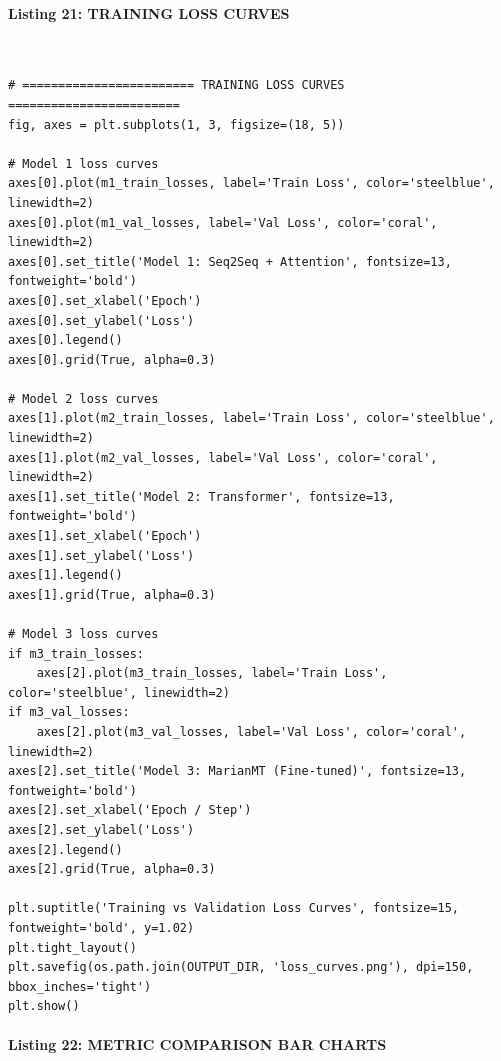 \documentclass[12pt,a4paper,oneside]{report}
\begin{document}
\paragraph{Listing 21: TRAINING LOSS CURVES}\mbox{}\\[-1ex]
\begin{Verbatim}[commandchars=\\\{\},breaklines=true,breakanywhere=true,fontsize=\scriptsize,frame=leftline,framesep=2mm,rulecolor=\color{gray}]
# ======================== TRAINING LOSS CURVES ========================
fig, axes = plt.subplots(1, 3, figsize=(18, 5))

# Model 1 loss curves
axes[0].plot(m1_train_losses, label='Train Loss', color='steelblue', linewidth=2)
axes[0].plot(m1_val_losses, label='Val Loss', color='coral', linewidth=2)
axes[0].set_title('Model 1: Seq2Seq + Attention', fontsize=13, fontweight='bold')
axes[0].set_xlabel('Epoch')
axes[0].set_ylabel('Loss')
axes[0].legend()
axes[0].grid(True, alpha=0.3)

# Model 2 loss curves
axes[1].plot(m2_train_losses, label='Train Loss', color='steelblue', linewidth=2)
axes[1].plot(m2_val_losses, label='Val Loss', color='coral', linewidth=2)
axes[1].set_title('Model 2: Transformer', fontsize=13, fontweight='bold')
axes[1].set_xlabel('Epoch')
axes[1].set_ylabel('Loss')
axes[1].legend()
axes[1].grid(True, alpha=0.3)

# Model 3 loss curves
if m3_train_losses:
    axes[2].plot(m3_train_losses, label='Train Loss', color='steelblue', linewidth=2)
if m3_val_losses:
    axes[2].plot(m3_val_losses, label='Val Loss', color='coral', linewidth=2)
axes[2].set_title('Model 3: MarianMT (Fine-tuned)', fontsize=13, fontweight='bold')
axes[2].set_xlabel('Epoch / Step')
axes[2].set_ylabel('Loss')
axes[2].legend()
axes[2].grid(True, alpha=0.3)

plt.suptitle('Training vs Validation Loss Curves', fontsize=15, fontweight='bold', y=1.02)
plt.tight_layout()
plt.savefig(os.path.join(OUTPUT_DIR, 'loss_curves.png'), dpi=150, bbox_inches='tight')
plt.show()
\end{Verbatim}
\paragraph{Listing 22: METRIC COMPARISON BAR CHARTS}\mbox{}\\[-1ex]
\end{document}
